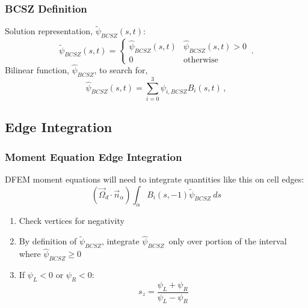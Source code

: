 \documentclass{beamer}
\newcommand{\be}{\begin{equation*}}   %
\newcommand{\ee}{\end{equation*}}
\newcommand{\benum}{\begin{equation}}   %
\newcommand{\eenum}{\end{equation}}
\newcommand{\B}[1]{\ensuremath{B_{#1} }}			%
\newcommand{\omg}{\ensuremath{\vec{\Omega}}}
\newcommand{\BCSZ}{\ensuremath{\widetilde{\psi}_{BCSZ}}}
\newcommand{\BCSZH}{\ensuremath{\widehat{\psi}_{BCSZ}}}
\newcommand{\pec}{\, ,}
\newcommand{\pep}{\, .}
\begin{document}
\begin{frame}
\frametitle{BCSZ Definition}
Solution representation, $\widetilde{\psi}_{BCSZ}(s,t)$:
\benum
\BCSZ(s,t) = \left \{ \begin{array}{ll}
\BCSZH(s,t) & \BCSZH(s,t) > 0 \\
0	& \text{otherwise}
\end{array}
\right. \pep
\label{eq:bcsz}
\eenum
Bilinear function, $\widehat{\psi}_{BCSZ}$, to search for,
\benum
\BCSZH(s,t) = \sum_{i=0}^3{\psi_{i,BCSZ} \B{i}(s,t)} \pec
\eenum

\end{frame}

\subsection{Edge Integration}
\begin{frame}
\frametitle{Moment Equation Edge Integration}
DFEM moment equations will need to integrate quantities like this on cell edges:
\be
(\omg_d \cdot \vec{n}_{\alpha}) \int_{\alpha}{\B{i}(s,-1) \BCSZ~ds}
\ee
\begin{enumerate}
\item Check vertices for negativity
\item By definition of \BCSZ, integrate \BCSZH ~only over portion of the interval where $\BCSZH\geq 0$
\item If $\psi_L < 0$ or $\psi_R < 0$:
\be
s_z = \frac{\psi_{L}+\psi_{R}}{\psi_{L} - \psi_{R} }
\ee
\end{enumerate}

\end{frame}

\end{document}
